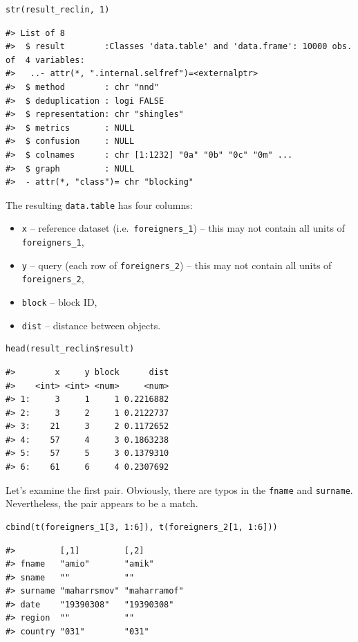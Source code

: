 \begin{verbatim}
str(result_reclin, 1)
\end{verbatim}

\begin{verbatim}
#> List of 8
#>  $ result        :Classes 'data.table' and 'data.frame': 10000 obs. of  4 variables:
#>   ..- attr(*, ".internal.selfref")=<externalptr> 
#>  $ method        : chr "nnd"
#>  $ deduplication : logi FALSE
#>  $ representation: chr "shingles"
#>  $ metrics       : NULL
#>  $ confusion     : NULL
#>  $ colnames      : chr [1:1232] "0a" "0b" "0c" "0m" ...
#>  $ graph         : NULL
#>  - attr(*, "class")= chr "blocking"
\end{verbatim}

The resulting \texttt{data.table} has four columns:

\begin{itemize}
\tightlist
\item
  \texttt{x} -- reference dataset (i.e.~\texttt{foreigners\_1}) -- this may not contain all units of \texttt{foreigners\_1},
\item
  \texttt{y} -- query (each row of \texttt{foreigners\_2}) -- this may not contain all units of \texttt{foreigners\_2},
\item
  \texttt{block} -- block ID,
\item
  \texttt{dist} -- distance between objects.
\end{itemize}

\begin{verbatim}
head(result_reclin$result)
\end{verbatim}

\begin{verbatim}
#>        x     y block      dist
#>    <int> <int> <num>     <num>
#> 1:     3     1     1 0.2216882
#> 2:     3     2     1 0.2122737
#> 3:    21     3     2 0.1172652
#> 4:    57     4     3 0.1863238
#> 5:    57     5     3 0.1379310
#> 6:    61     6     4 0.2307692
\end{verbatim}

Let's examine the first pair. Obviously, there are typos in the \texttt{fname} and \texttt{surname}. Nevertheless, the pair appears to be a match.

\begin{verbatim}
cbind(t(foreigners_1[3, 1:6]), t(foreigners_2[1, 1:6]))
\end{verbatim}

\begin{verbatim}
#>         [,1]         [,2]        
#> fname   "amio"       "amik"      
#> sname   ""           ""          
#> surname "maharrsmov" "maharramof"
#> date    "19390308"   "19390308"  
#> region  ""           ""          
#> country "031"        "031"
\end{verbatim}

